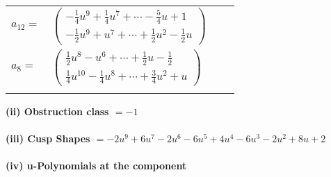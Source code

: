 \documentclass[1p]{elsarticle_modified}
\theoremstyle{definition}
\begin{document}
\begin{tabular}{m{7pt} m{180pt} m{7pt} m{180pt} }
\flushright $a_{12}=$&$\begin{pmatrix}-\frac{1}{4} u^9+\frac{1}{4} u^7+\cdots-\frac{5}{4} u+1\\-\frac{1}{2} u^9+u^7+\cdots+\frac{1}{2} u^2-\frac{1}{2} u\end{pmatrix}$ \\
\flushright $a_{8}=$&$\begin{pmatrix}\frac{1}{2} u^8- u^6+\cdots+\frac{1}{2} u-\frac{1}{2}\\\frac{1}{4} u^{10}-\frac{1}{4} u^8+\cdots+\frac{3}{4} u^2+u\end{pmatrix}$\\&\end{tabular}
\flushleft \textbf{(ii) Obstruction class $= -1$}\\~\\
\flushleft \textbf{(iii) Cusp Shapes $= -2 u^9+6 u^7-2 u^6-6 u^5+4 u^4-6 u^3-2 u^2+8 u+2$}\\~\\
\newpage\renewcommand{\arraystretch}{1}
\flushleft \textbf{(iv) u-Polynomials at the component}\newline \\
\end{document}
